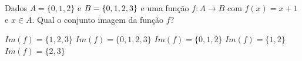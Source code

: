 Dados $A=\{ 0,1,2 \}$ e $B=\{ 0, 1, 2, \\ 3\}$ e uma função $f:A\longrightarrow B$ com $f(x)=x+1$ e $x\in A$. Qual o conjunto imagem da função $f$?

$Im(f)=\{ 1,2,3 \}$
$Im(f)=\{ 0,1,2,3 \}$
$Im(f)=\{ 0,1,2 \}$
$Im(f)=\{ 1,2 \}$
$Im(f)=\{ 2,3 \}$



